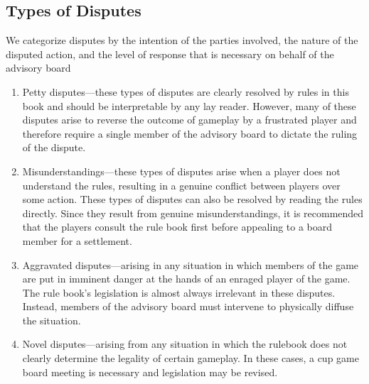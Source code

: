 \documentclass[12pt]{IEEEconf}
\begin{document}
\subsection{Types of Disputes}
We categorize disputes by the intention of the parties involved, the nature of the disputed action, and the level of response that is necessary on behalf of the advisory board
\begin{enumerate}
    \item Petty disputes---these types of disputes are clearly resolved by rules in this book and should be interpretable by any lay reader. However, many of these disputes arise to reverse the outcome of gameplay by a frustrated player and therefore require a single member of the advisory board to dictate the ruling of the dispute.
    \item Misunderstandings---these types of disputes arise when a player does not understand the rules, resulting in a genuine conflict between players over some action. These types of disputes can also be resolved by reading the rules directly. Since they result from genuine misunderstandings, it is recommended that the players consult the rule book first before appealing to a board member for a settlement.
    \item Aggravated disputes---arising in any situation in which members of the game are put in imminent danger at the hands of an enraged player of the game. The rule book's legislation is almost always irrelevant in these disputes. Instead, members of the advisory board must intervene to physically diffuse the situation.
    \item Novel disputes---arising from any situation in which the rulebook does not clearly determine the legality of certain gameplay. In these cases, a cup game board meeting is necessary and legislation may be revised.
\end{enumerate}
\end{document}

